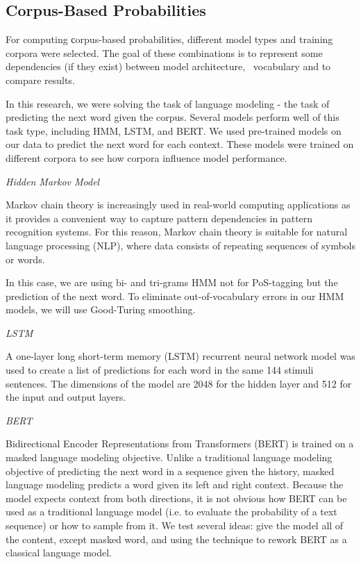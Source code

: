 \documentclass[a4paper]{article}
\newcommand{\head}[1]{\vspace{0.5em}\emph{#1}\vspace{0.25em}}
\begin{document}
\subsection{Corpus-Based Probabilities}

For computing сorpus-based probabilities, different model types and training corpora were selected. The goal of these combinations is to represent some dependencies (if they exist) between model architecture,  vocabulary and to compare results.

In this research, we were solving the task of language modeling - the task of predicting the next word given the corpus. 
Several models perform well of this task type, including HMM, LSTM, and BERT. We used pre-trained models on our data to predict the next word for each context. These models were trained on different corpora to see how corpora influence model performance.

\head{Hidden Markov Model}

Markov chain theory is increasingly used in real-world computing applications as it provides a convenient way to capture pattern dependencies in pattern recognition systems. For this reason, Markov chain theory is suitable for natural language processing (NLP), where data consists of repeating sequences of symbols or words. 

In this case, we are using bi- and tri-grams HMM not for PoS-tagging but the prediction of the next word. To eliminate out-of-vocabulary errors in our HMM models, we will use Good-Turing smoothing.

\head{LSTM}

A one-layer long short-term memory (LSTM) recurrent neural network model was used \cite{jozefowicz:2016} to create a list of predictions for each word in the same 144 stimuli sentences. The dimensions of the model are 2048 for the hidden layer and 512 for the input and output layers. 

\head{BERT}

Bidirectional Encoder Representations from Transformers
(BERT) \cite{bert} is trained on a masked language modeling objective. Unlike a traditional language modeling objective of predicting the next word in a sequence given the history, masked language modeling predicts a word given its left and right context. Because the model expects context from both directions, it is not obvious how BERT can be used as a traditional language model (i.e. to evaluate the probability of a text sequence) or how to sample from it. We test several ideas: give the model all of the content, except masked word, and using the technique\cite{wang2019bert_lm} to rework BERT as a classical language model.
\end{document}
